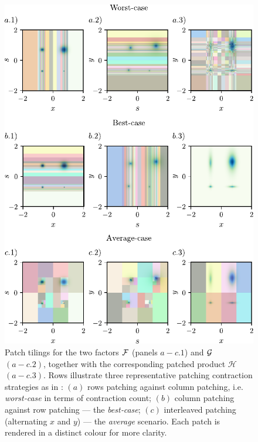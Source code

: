 \begin{figure}[htbp]
    \centering
    \includegraphics{figures/PatchContrResults.pdf}
    \caption{Patch tilings for the two factors \(\mathcal{F}\) (panels
    $a-c.1$) and \(\mathcal{G}\) $(a-c.2)$, together with the corresponding
    patched product \(\mathcal H\) $(a-c.3)$. Rows illustrate three representative patching contraction strategies as in : $(a)$ rows patching against column patching, i.e. \emph{worst‐case} in terms of contraction count;
    $(b)$ column patching against row patching — the \emph{best‐case};
   $(c)$ interleaved patching (alternating \(x\) and \(y\)) — the
    \emph{average} scenario. Each patch is rendered in a distinct colour for more clarity.}
    \label{fig:patchingPatternsMatMul}
\end{figure}

